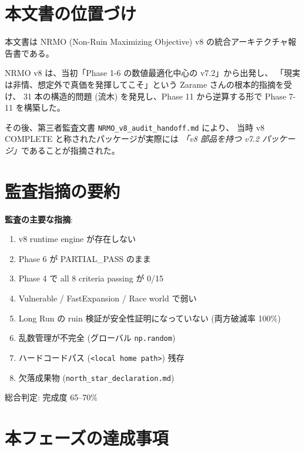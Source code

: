 \documentclass[a4paper,11pt]{report}
\begin{document}
\section{本文書の位置づけ}

本文書は NRMO (Non-Ruin Maximizing Objective) v8 の統合アーキテクチャ報告書である。

NRMO v8 は、当初「Phase 1-6 の数値最適化中心の v7.2」から出発し、
「現実は非情、想定外で真価を発揮してこそ」という Zarame さんの根本的指摘を受け、
31 本の構造的問題 (流木) を発見し、Phase 11 から逆算する形で Phase 7-11 を構築した。

その後、第三者監査文書 \texttt{NRMO\_v8\_audit\_handoff.md} により、
当時 v8 COMPLETE と称されたパッケージが実際には
\emph{「v8 部品を持つ v7.2 パッケージ」}であることが指摘された。

\section{監査指摘の要約}

\begin{tcolorbox}[colback=warning!5, colframe=warning]
\textbf{監査の主要な指摘}:

\begin{enumerate}[leftmargin=*]
  \item v8 runtime engine が存在しない
  \item Phase 6 が PARTIAL\_PASS のまま
  \item Phase 4 で all 8 criteria passing が 0/15
  \item Vulnerable / FastExpansion / Race world で弱い
  \item Long Run の ruin 検証が安全性証明になっていない (両方破滅率 100\%)
  \item 乱数管理が不完全 (グローバル \texttt{np.random})
  \item ハードコードパス (\texttt{<local home path>}) 残存
  \item 欠落成果物 (\texttt{north\_star\_declaration.md})
\end{enumerate}

総合判定: 完成度 65--70\%
\end{tcolorbox}

\section{本フェーズの達成事項}
\end{document}
